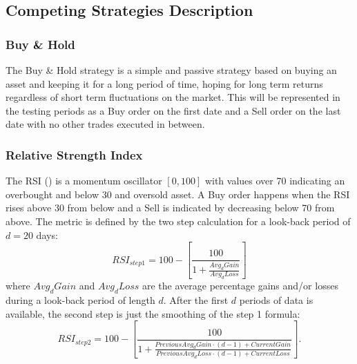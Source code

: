 \documentclass[11pt, a4paper]{article}
\begin{document}
\subsection{Competing Strategies Description}
\label{app:CompetingStrats}

\subsubsection{Buy \& Hold}
The Buy \& Hold strategy is a simple and passive strategy based on buying an asset and keeping it for a long period of time, hoping for long term returns regardless of short term fluctuations on the market.
This will be represented in the testing periods as a Buy order on the first date and a Sell order on the last date with no other trades executed in between.

\subsubsection{Relative Strength Index}
The RSI (\cite{wilder1986relative}) is a momentum oscillator $[0, 100]$ with values over 70 indicating an overbought and below 30 and oversold asset. A Buy order happens when the RSI rises above 30 from below and a Sell is indicated by decreasing below 70 from above. The metric is defined by the two step calculation for a look-back period of $d=20$ days:
\begin{equation}
    \label{eq:RSI1}
    RSI_{step1} = 100 - \left[ \frac{100}{1 + \frac{Avg_d Gain}{Avg_d Loss}}\right]
\end{equation}
where $Avg_d Gain$ and $Avg_d Loss$ are the average percentage gains and/or losses during a look-back period of length $d$. After the first $d$ periods of data is available, the second step is just the smoothing of the step 1 formula:
\begin{equation}
    \label{eq:RSI2}
    RSI_{step2} = 100 - \left[ \frac{100}{1 + \frac{Previous Avg_d Gain \cdot (d-1) + Current Gain}{Previous Avg_d Loss \cdot (d-1) + Current Loss}}\right].
\end{equation}
\end{document}
